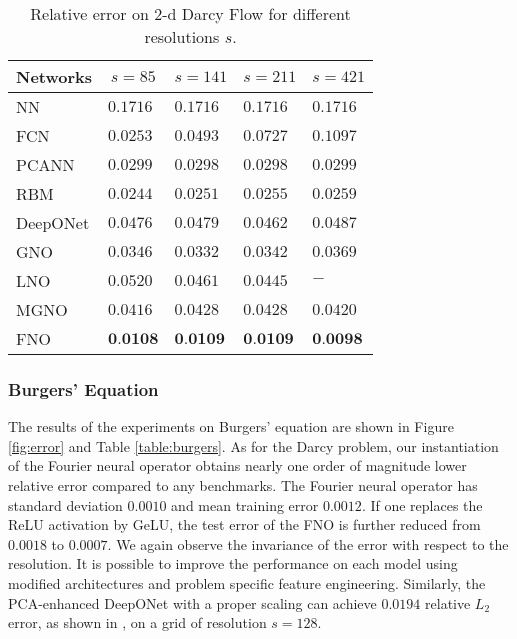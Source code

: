 \begin{table}[ht]

\begin{center}
\begin{tabular}{l|llll}
\multicolumn{1}{c}{\bf Networks} 
&\multicolumn{1}{c}{\bf $s=85$}
&\multicolumn{1}{c}{\bf $s=141$} 
&\multicolumn{1}{c}{\bf $s=211$}
&\multicolumn{1}{c}{\bf $s=421$}\\
\hline
NN       &$0.1716$  &$0.1716$  &$0.1716$ &$0.1716$\\
FCN       &$0.0253$  &$0.0493$  &$0.0727$ & $0.1097$\\
PCANN      &$0.0299$  &$0.0298$  &$0.0298$ & $0.0299$\\
RBM    &$0.0244$ &$0.0251$ &$0.0255$ &$0.0259$ \\
DeepONet    &$0.0476$ &$0.0479$ &$0.0462$ &$0.0487$ \\
\hline 
GNO     &$0.0346$   &$0.0332$  &$0.0342$ &$0.0369$\\
LNO     &$0.0520$  &$0.0461$  &$0.0445$ &$-$\\
MGNO     &$0.0416$   &$0.0428$  &$0.0428$ &$0.0420$\\
FNO     &$\textbf{0.0108}$  &$\textbf{0.0109}$  &$\textbf{0.0109}$ &$\textbf{0.0098}$\\
\hline 
\end{tabular}
\end{center}
\caption{Relative error on 2-d Darcy Flow for different resolutions $s$.}
\label{table:darcy}
\end{table}

\subsubsection{Burgers' Equation}
\label{ssec:BE}


The results of the experiments on Burgers' equation are shown in Figure \ref{fig:error} and Table \ref{table:burgers}. As for the Darcy problem, our instantiation of the Fourier neural operator obtains nearly one order of magnitude lower relative error compared to any benchmarks. The Fourier neural operator has standard deviation $0.0010$ and mean training error $0.0012$. If one replaces the ReLU activation by GeLU, the test error of the FNO is further reduced from $0.0018$ to \textbf{$0.0007$}.
We again observe the invariance of the error with respect to the resolution. 
It is possible to improve the performance on each model using modified architectures and problem specific feature engineering.
Similarly, the PCA-enhanced DeepONet with a proper scaling can achieve $0.0194$ relative $L_2$ error, as shown in \cite{lu2021comprehensive}, on a grid of resolution $s=128$.

